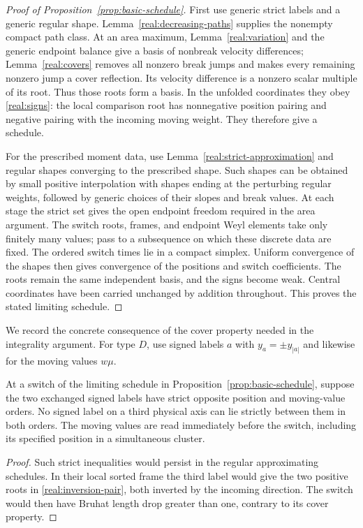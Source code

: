 \begin{proof}[Proof of Proposition~\ref{prop:basic-schedule}]
First use generic strict labels and a generic regular shape.
Lemma~\ref{real:decreasing-paths} supplies the nonempty compact path
class.  At an area maximum, Lemma~\ref{real:variation} and the generic
endpoint balance give a basis of nonbreak velocity differences;
Lemma~\ref{real:covers} removes all nonzero break jumps and makes
every remaining nonzero jump a cover reflection.  Its velocity
difference is a nonzero scalar multiple of its root.  Thus those
roots form a basis.  In the unfolded coordinates they obey
\eqref{real:signs}: the local comparison root has nonnegative
position pairing and negative pairing with the incoming moving
weight.  They therefore give a schedule.

For the prescribed moment data, use Lemma~\ref{real:strict-approximation}
and regular shapes converging to the prescribed shape.  Such shapes
can be obtained by small positive interpolation with shapes ending at
the perturbing regular weights, followed by generic choices of their
slopes and break values.  At each stage the strict set gives the
open endpoint freedom required in the area argument.  The switch
roots, frames, and endpoint Weyl elements take only finitely many
values; pass to a subsequence on which these discrete data are fixed.
The ordered switch times lie in a compact simplex.  Uniform convergence
of the shapes then gives convergence of the positions and switch
coefficients.  The roots remain the same independent basis, and the
signs become weak.  Central coordinates have been carried unchanged
by addition throughout.  This proves the stated limiting schedule.
\end{proof}

We record the concrete consequence of the cover property needed in
the integrality argument.  For type $D$, use signed labels $a$ with
$y_a=\pm y_{|a|}$ and likewise for the moving values $w\mu$.

\begin{corollary}\label{real:blocker}
At a switch of the limiting schedule in
Proposition~\ref{prop:basic-schedule}, suppose the two exchanged
signed labels have strict opposite position and moving-value orders.
No signed label on a third physical axis can lie strictly between
them in both orders.  The moving values are read immediately before
the switch, including its specified position in a simultaneous cluster.
\end{corollary}

\begin{proof}
Such strict inequalities would persist in the regular approximating
schedules.  In their local sorted frame the third label would give
the two positive roots in \eqref{real:inversion-pair}, both inverted
by the incoming direction.  The switch would then have Bruhat length
drop greater than one, contrary to its cover property.
\end{proof}
